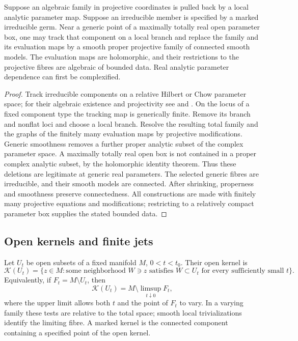 \begin{lemma}\label{lem:prep-projective-models}
Suppose an algebraic family in projective coordinates is pulled back by a local analytic parameter map. Suppose an irreducible member is specified by a marked irreducible germ. Near a generic point of a maximally totally real open parameter box, one may track that component on a local branch and replace the family and its evaluation maps by a smooth proper projective family of connected smooth models. The evaluation maps are holomorphic, and their restrictions to the projective fibres are algebraic of bounded data. Real analytic parameter dependence can first be complexified.
\end{lemma}

\begin{proof}
Track irreducible components on a relative Hilbert or Chow parameter space; for their algebraic existence and projectivity see \cite[\S3, Theorems~3.1--3.2]{Grothendieck1961} and \cite[\S2.4(b), Proposition~4]{AndreottiNorguet1967}. On the locus of a fixed component type the tracking map is generically finite. Remove its branch and nonflat loci and choose a local branch. Resolve the resulting total family and the graphs of the finitely many evaluation maps by projective modifications. Generic smoothness removes a further proper analytic subset of the complex parameter space. A maximally totally real open box is not contained in a proper complex analytic subset, by the holomorphic identity theorem. Thus these deletions are legitimate at generic real parameters. The selected generic fibres are irreducible, and their smooth models are connected. After shrinking, properness and smoothness preserve connectedness. All constructions are made with finitely many projective equations and modifications; restricting to a relatively compact parameter box supplies the stated bounded data.
\end{proof}

\subsection{Open kernels and finite jets}

\begin{definition}\label{def:prep-kernel}
Let $U_t$ be open subsets of a fixed manifold $M$, $0<t<t_0$. Their open kernel is
\[
 \mathcal{K}(U_t)=\{z\in M: \text{some neighborhood }W\ni z
       \text{ satisfies }W\subset U_t
       \text{ for every sufficiently small }t\}.
\]
Equivalently, if $F_t=M\setminus U_t$, then
\[
 \mathcal{K}(U_t)=M\setminus\limsup_{t\downarrow0}F_t,
\]
where the upper limit allows both $t$ and the point of $F_t$ to vary. In a varying family these tests are relative to the total space; smooth local trivializations identify the limiting fibre. A marked kernel is the connected component containing a specified point of the open kernel.
\end{definition}

